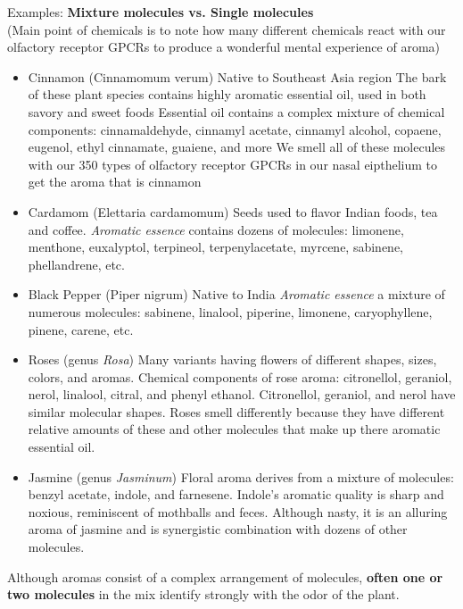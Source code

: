 \documentclass{article}
\begin{document}
\noindent Examples: \textbf{Mixture molecules vs. Single molecules} \\
(Main point of chemicals is to note how many different chemicals react with our olfactory receptor GPCRs to produce a wonderful mental experience of aroma)\\
\begin{itemize}
    \item Cinnamon (Cinnamomum verum)
        \subitem Native to Southeast Asia region
        \subitem The bark of these plant species contains highly aromatic essential oil, used in both savory and sweet foods
        \subitem Essential oil contains a complex mixture of chemical components: cinnamaldehyde, cinnamyl acetate, cinnamyl alcohol, copaene, eugenol, ethyl cinnamate, guaiene, and more
        \subitem We smell all of these molecules with our 350 types of olfactory receptor GPCRs in our nasal eipthelium to get the aroma that is cinnamon
    \item Cardamom (Elettaria cardamomum)
        \subitem Seeds used to flavor Indian foods, tea and coffee. 
        \subitem \textit{Aromatic essence} contains dozens of molecules: limonene, menthone, euxalyptol, terpineol, terpenylacetate, myrcene, sabinene, phellandrene, etc. 
    \item Black Pepper (Piper nigrum)
        \subitem Native to India
        \subitem \textit{Aromatic essence} a mixture of numerous molecules: sabinene, linalool, piperine, limonene, caryophyllene, pinene, carene, etc.
    \item Roses (genus \textit{Rosa})
        \subitem Many variants having flowers of different shapes, sizes, colors, and aromas. 
        \subitem Chemical components of rose aroma: citronellol, geraniol, nerol, linalool, citral, and phenyl ethanol. 
        \subitem Citronellol, geraniol, and nerol have similar molecular shapes. Roses smell differently because they have different relative amounts of these and other molecules that make up there aromatic essential oil. 
    \item Jasmine (genus \textit{Jasminum})
        \subitem Floral aroma derives from a mixture of molecules: benzyl acetate, indole, and farnesene. 
        \subitem Indole's aromatic quality is sharp and noxious, reminiscent of mothballs and feces. Although nasty, it is an alluring aroma of jasmine and is synergistic combination with dozens of other molecules. 
\end{itemize}

Although aromas consist of a complex arrangement of molecules, \textbf{often one or two molecules} in the mix identify strongly with the odor of the plant. \\
\end{document}
